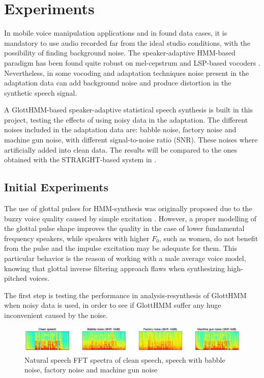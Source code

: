 \section{Experiments}
\label{experiments}
In mobile voice manipulation applications and in found data cases, it is mandatory to use audio recorded far from the ideal studio conditions, with the possibility of finding background noise.
%
The speaker-adaptive HMM-based paradigm has been found quite robust on mel-cepstrum \cite{karhila_jstsp_14, yamagishi2008robustness} and LSP-based vocoders \cite{yanagisawa2013noise}.
%
Nevertheless, in some vocoding and adaptation techniques noise present in the adaptation data can add background noise and produce distortion in the synthetic speech signal.

A GlottHMM-based speaker-adaptive statistical speech synthesis is built in this project, testing the effects of using noisy data in the adaptation.
%
The different noises included in the adaptation data are: babble noise, factory noise and machine gun noise, with different signal-to-noise ratio (SNR).
%
These noises where artificially added into clean data.
%
The results will be compared to the ones obtained with the STRAIGHT-based system in \cite{karhila_jstsp_14}.

\subsection{Initial Experiments}
\label{experiments_initial}
The use of glottal pulses for HMM-synthesis was originally proposed due to the buzzy voice quality caused by simple excitation \cite{raitio2008hmm}.
%
However, a proper modelling of the glottal pulse shape improves the quality in the case of lower fundamental frequency speakers, while speakers with higher $F_{0}$, such as women, do not benefit from the pulse and the impulse excitation may be adequate for them.
%
This particular behavior is the reason of working with a male average voice model, knowing that glottal inverse filtering approach flaws when synthesizing high-pitched voices.

The first step is testing the performance in analysis-resynthesis of GlottHMM when noisy data is used, in order to see if GlottHMM suffer any huge inconvenient caused by the noise.

\begin{figure}[!htb]
\begin{centering}
\includegraphics[width=\textwidth]{images/natural_spectra.jpg}
\caption{Natural speech FFT spectra of clean speech, speech with babble noise, factory noise and machine gun noise}
\label{fig:natural_spectra}
\end{centering}
\end{figure}

